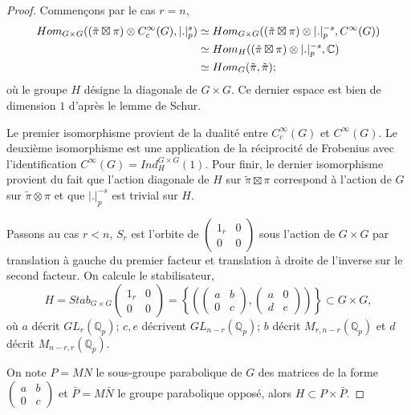 \begin{proof}

Commençons par le cas $r=n$,
\begin{align}
\operatorname{\mathnormal{Hom}}_{G \times G}( (\tilde{\pi} \boxtimes \pi) \otimes C_c^\infty(G), |.|_p^s) &\simeq \operatorname{\mathnormal{Hom}}_{G \times G}( (\tilde{\pi} \boxtimes \pi) \otimes |.|_p^{-s}, C^\infty(G)) \\
&\simeq \operatorname{\mathnormal{Hom}}_H( (\tilde{\pi} \boxtimes \pi) \otimes |.|_p^{-s}, \mathbb{C}) \\
&\simeq \operatorname{\mathnormal{Hom}}_G(\tilde{\pi}, \tilde{\pi});
\end{align}
où le groupe $H$ désigne la diagonale de $G \times G$. Ce dernier espace est bien de dimension $1$ d'après le lemme de Schur.

Le premier isomorphisme provient de la dualité entre $C_c^\infty(G)$ et $C^\infty(G)$. Le deuxième isomorphisme est une application de la réciprocité de Frobenius avec l'identification $C^\infty(G) = Ind_H^{G \times G}(1)$. Pour finir, le dernier isomorphisme provient du fait que l'action diagonale de $H$ sur $\tilde{\pi} \boxtimes \pi$ correspond à l'action de $G$ sur $\tilde{\pi} \otimes \pi$ et que $|.|_p^{-s}$ est trivial sur $H$.

Passons au cas $r < n$, $S_r$ est l'orbite de $\begin{pmatrix} 
1_r & 0 \\
0 & 0 
\end{pmatrix}$ sous l'action de $G \times G$ par translation à gauche du premier facteur et translation à droite de l'inverse sur le second facteur. On calcule le stabilisateur,
\begin{equation}
H = Stab_{G \times G} \begin{pmatrix} 
1_r & 0 \\
0 & 0 
\end{pmatrix} = \left\lbrace \left(\begin{pmatrix} 
a & b \\
0 & c 
\end{pmatrix}, \begin{pmatrix} 
a & 0 \\
d & e 
\end{pmatrix} \right) \right\rbrace \subset G \times G,
\end{equation}
où $a$ décrit $GL_r(\mathbb{Q}_p)$; $c, e$ décrivent $GL_{n-r}(\mathbb{Q}_p)$; $b$ décrit $M_{r,n-r}(\mathbb{Q}_p)$ et $d$ décrit $M_{n-r,r}(\mathbb{Q}_p)$.
 
On note $P = MN$ le sous-groupe parabolique de $G$ des matrices de la forme $\begin{pmatrix} 
a & b \\
0 & c 
\end{pmatrix}$ et $\bar{P} = M\bar{N}$ le groupe parabolique opposé, alors $H \subset P \times \bar{P}$.


\end{proof}
